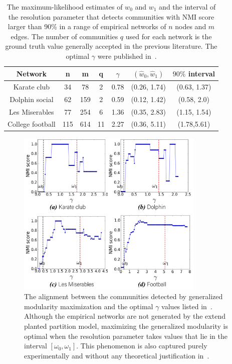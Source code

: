 \begin{table}[]
    \centering
    \caption{The maximum-likelihood estimates of $w_0$ and $w_1$ and the interval of the resolution parameter that detects communities with NMI score larger than 90\% in a range of empirical networks of $n$ nodes and $m$ edges. The number of communities $q$ used for each network is the ground truth value generally accepted in the previous literature. The optimal $\gamma$ were published in~\cite{newman2016equivalence}.}
    \label{tab:small_networks}
    \begin{tabular}{ccccccc}
    \hline
    Network & n & m & q & $\gamma$ & $(\hat{w}_0,\hat{w}_1)$ & $90\%$ interval\\
    \hline
    Karate club & 34 & 78 &  2 & 0.78 & (0.26, 1.74) & (0.63, 1.37)\\
    Dolphin social & 62 & 159 & 2 & 0.59 & (0.12, 1.42) & (0.58, 2.0)\\
    Les Miserables & 77 & 254 & 6 & 1.36 &  (0.35, 2.83) & (1.15,  1.54)\\
    College football & 115 & 614 & 11 & 2.27 & (0.36, 5.11) & (1.78,5.61)\\
    \hline
    \end{tabular}
\end{table}


\begin{figure}[t!]
    \centering
    \includegraphics[width=0.8\textwidth]{img/chap2/Fig6.pdf}
    \caption{The alignment between the communities detected by generalized modularity maximization and the optimal $\gamma$ values listed in~\cite{newman2016equivalence}. Although the empirical networks are not generated by the extend planted partition model, maximizing the generalized modularity is optimal when the resolution parameter takes values that lie in the interval $[\omega_0, \omega_1]$. This phenomenon is also captured purely experimentally and without any theoretical justification in~\cite{fenn2009dynamic,mucha2010community,traag2013significant}.}
    \label{fig:small_networks}
\end{figure}


